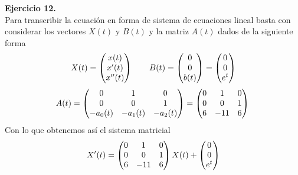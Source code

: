 \documentclass[fleqn]{article}
\begin{document}
    \textbf{Ejercicio 12. } \\

    Para transcribir la ecuación en forma de sistema de ecuaciones lineal basta con considerar los vectores $X(t)$ y $B(t)$ y la matriz $A(t)$ dados de la siguiente forma
    $$
    X(t) = 
    \begin{pmatrix}
        x(t) \\
        x'(t) \\
        x''(t) \\
    \end{pmatrix}\\
    \quad \quad
    B(t)=
    \begin{pmatrix}
        0 \\ 0 \\ b(t)
    \end{pmatrix}
    =
    \begin{pmatrix}
        0 \\ 0 \\ e^t
    \end{pmatrix}
    $$
    $$
    A(t)=
    \begin{pmatrix}
        0 & 1 & 0\\
        0 & 0 & 1\\
        -a_0(t) & -a_1(t) & -a_2(t)\\
    \end{pmatrix}
    =
    \begin{pmatrix}
        0 & 1 & 0\\
        0 & 0 & 1\\
        6 & -11 & 6\\
    \end{pmatrix}\\
    $$
    Con lo que obtenemos así el sistema matricial
    $$
    X'(t)=
    \begin{pmatrix}
        0 & 1 & 0\\
        0 & 0 & 1\\
        6 & -11 & 6\\
    \end{pmatrix}\\
    X(t) + 
    \begin{pmatrix}
        0 \\ 0 \\ e^t
    \end{pmatrix}
    $$
\end{document}
